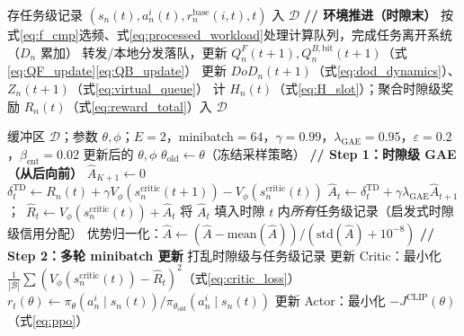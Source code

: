 \documentclass[a4paper,11pt]{article}
\begin{document}
\begin{algorithm}[t]
\begin{algorithmic}[1]
      \ENDIF
      \STATE 存任务级记录 $(s_n(t),a^i_n(t),r^{\mathrm{base}}_n(i,t),t)$ 入 $\mathcal{D}$
    \ENDFOR
  \ENDFOR
  \STATE \textbf{// 环境推进（时隙末）}
    \STATE 按式\eqref{eq:f_cmp}选频、式\eqref{eq:processed_workload}处理计算队列，完成任务离开系统（$D_n$ 累加）
    \STATE 转发/本地分发落队，更新 $Q^F_n(t\!+\!1),Q^{B,\mathrm{bit}}_n(t\!+\!1)$（式\eqref{eq:QF_update}\eqref{eq:QB_update}）
    \STATE 更新 $DoD_n(t\!+\!1)$（式\eqref{eq:dod_dynamics}）、$Z_n(t\!+\!1)$（式\eqref{eq:virtual_queue}）
    \STATE 计 $H_n(t)$（式\eqref{eq:H_slot}）；聚合时隙级奖励 $R_n(t)$（式\eqref{eq:reward_total}）入 $\mathcal{D}$
  \ENDFOR
\ENDFOR
\end{algorithmic}
\end{algorithm}

\begin{algorithm}[t]
\caption{DA-MAPPO 网络参数更新（训练层）}
\label{alg:training}
\begin{algorithmic}[1]
\REQUIRE 缓冲区 $\mathcal{D}$；参数 $\theta,\phi$；$E{=}2$，minibatch${=}64$，$\gamma{=}0.99$，$\lambda_{\mathrm{GAE}}{=}0.95$，$\varepsilon{=}0.2$，$\beta_{\mathrm{ent}}{=}0.02$
\ENSURE 更新后的 $\theta,\phi$
\STATE $\theta_{\mathrm{old}} \leftarrow \theta$（冻结采样策略）
\STATE \textbf{// Step 1：时隙级 GAE（从后向前）}
  \STATE $\hat{A}_{K+1} \leftarrow 0$
    \STATE $\delta^{\mathrm{TD}}_t \leftarrow R_n(t) + \gamma V_\phi(s^{\mathrm{critic}}_n(t\!+\!1)) - V_\phi(s^{\mathrm{critic}}_n(t))$
    \STATE $\hat{A}_t \leftarrow \delta^{\mathrm{TD}}_t + \gamma\lambda_{\mathrm{GAE}}\hat{A}_{t+1}$；\ $\hat{R}_t \leftarrow V_\phi(s^{\mathrm{critic}}_n(t)) + \hat{A}_t$
    \STATE 将 $\hat{A}_t$ 填入时隙 $t$ 内\emph{所有}任务级记录（启发式时隙级信用分配）
  \ENDFOR
\ENDFOR
\STATE 优势归一化：$\hat{A} \leftarrow (\hat{A}-\mathrm{mean}(\hat{A}))/(\mathrm{std}(\hat{A})+10^{-8})$
\STATE \textbf{// Step 2：多轮 minibatch 更新}
  \STATE 打乱时隙级与任务级记录
    \STATE 更新 Critic：最小化 $\frac{1}{|\mathcal{B}|}\sum(V_\phi(s^{\mathrm{critic}}_n(t))-\hat{R}_t)^2$（式\eqref{eq:critic_loss}）
    \STATE $r_t(\theta) \leftarrow \pi_\theta(a^i_n\mid s_n(t))/\pi_{\theta_{\mathrm{old}}}(a^i_n\mid s_n(t))$
    \STATE 更新 Actor：最小化 $-J^{\mathrm{CLIP}}(\theta)$（式\eqref{eq:ppo}）
  \ENDFOR
\ENDFOR
\end{algorithmic}
\end{algorithm}
\end{document}

